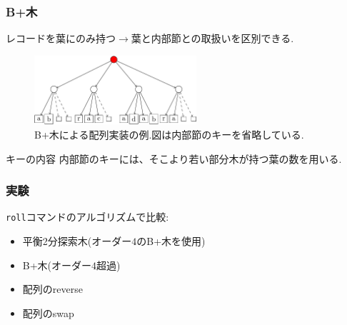 \documentclass[10pt,draft]{beamer}
\begin{document}
\begin{frame}
    \frametitle{B+木}

    レコードを葉にのみ持つ$\longrightarrow$葉と内部節との取扱いを区別できる.
    \begin{figure}
        \includegraphics[width=6cm]{abracadabra.png}
        \caption{B+木による配列実装の例.図は内部節のキーを省略している.}
    \end{figure}

    \begin{alertblock}{キーの内容}
        内部節のキーには、そこより若い部分木が持つ葉の数を用いる.
    \end{alertblock}

\end{frame}
\begin{frame}
    \frametitle{実験}

    \texttt{roll}コマンドのアルゴリズムで比較:
    \begin{itemize}
        \item 平衡2分探索木(オーダー$4$のB+木を使用)
        \item B+木(オーダー$4$超過)
        \item 配列のreverse
        \item 配列のswap
    \end{itemize}
\end{frame}


\end{document}
